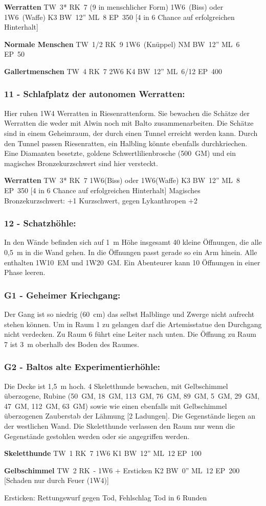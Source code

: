 \textbf{Werratten} TW~3* RK~7 (9 in menschlicher Form) 1W6~(Biss) oder 1W6~(Waffe)
K3 BW~12'' ML~8 EP~350 [4 in 6 Chance auf erfolgreichen Hinterhalt] 

\textbf{Normale Menschen} TW~1/2 RK~9 1W6~(Knüppel) NM BW~12'' ML~6 EP~50 

\textbf{Gallertmenschen} TW~4 RK~7 2W6 K4 BW~12'' ML~6/12 EP~400

\subsubsection{11 - Schlafplatz der autonomen Werratten:} Hier ruhen 1W4 Werratten in
Riesenrattenform. Sie bewachen die Schätze der Werratten die weder
mit Alwin noch mit Balto zusammenarbeiten. Die Schätze sind in einem
Geheimraum, der durch einen Tunnel erreicht werden kann. Durch den Tunnel
passen Riesenratten, ein Halbling könnte ebenfalls durchkriechen. Eine
Diamanten besetzte, goldene Schwertlilienbrosche (500~GM) und ein
magisches Bronzekurzschwert sind hier versteckt.

\textbf{Werratten} TW~3* RK~7 1W6(Biss) oder 1W6(Waffe) K3 BW~12'' ML~8 EP~350 [4 in 6 Chance auf
erfolgreichen Hinterhalt] Magisches Bronzekurzschwert: +1 Kurzschwert,
gegen Lykanthropen +2

\subsubsection{12 - Schatzhöhle:} In den Wände befinden sich auf 1~m Höhe insgesamt 40
kleine Öffnungen, die alle 0,5~m in die Wand gehen. In die Öffnungen
passt gerade so ein Arm hinein. Alle enthalten 1W10~EM und 1W20~GM. Ein
Abenteurer kann 10 Öffnungen in einer Phase leeren.

\subsubsection{G1 - Geheimer Kriechgang:} Der Gang ist so niedrig (60~cm) das selbst
Halblinge und Zwerge nicht aufrecht stehen können. Um in Raum 1 zu
gelangen darf die Artemisstatue den Durchgang nicht verdecken. Zu Raum
6 führt eine Leiter nach unten. Die Öffnung zu Raum 7 ist 3~m oberhalb
des Boden des Raumes.

\subsubsection{G2 - Baltos alte Experimentierhöhle:} Die Decke ist 1,5~m hoch. 4
Skeletthunde bewachen, mit Gelbschimmel überzogene, Rubine (50~GM, 18~GM,
113~GM, 76~GM, 89~GM, 5~GM, 29~GM, 47~GM, 112~GM, 63~GM) sowie wie einen ebenfalls
mit Gelbschimmel überzogenen Zauberstab der Lähmung [2 Ladungen]. Die
Gegenstände liegen an der westlichen Wand. Die Skeletthunde verlassen
den Raum nur wenn die Gegenstände gestohlen werden oder sie angegriffen
werden.

\textbf{Skeletthunde} TW~1 RK~7  1W6 K1 BW~12'' ML~12 EP~100 

\textbf{Gelbschimmel} TW~2 RK~- 1W6 + Ersticken K2 BW~0'' ML~12 EP~200 [Schaden nur durch Feuer (1W4)]

Ersticken: Rettungswurf gegen Tod, Fehlschlag Tod in 6 Runden


